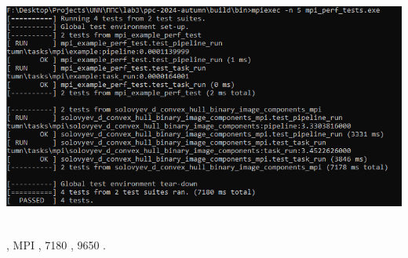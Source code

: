 \documentclass[a4paper]{article}
\begin{document}
\begin{center}
\includegraphics[width=439.14pt,height=222.69pt]{report-img002.png}
\end{center}
{
\foreignlanguage{russian}{{\CYRV} {\cyrr}{\cyre}{\cyrz}{\cyru}{\cyrl}{\cyrsftsn}{\cyrt}{\cyra}{\cyrt}{\cyre},
}\foreignlanguage{english}{MPI }\foreignlanguage{russian}{{\cyra}{\cyrl}{\cyrg}{\cyro}{\cyrr}{\cyri}{\cyrt}{\cyrm}
{\cyro}{\cyrk}{\cyra}{\cyrz}{\cyra}{\cyrl}{\cyrs}{\cyrya} {\cyrb}{\cyrery}{\cyrs}{\cyrt}{\cyrr}{\cyre}{\cyre}, {\cyrs}
{\cyro}{\cyrb}{\cyrshch}{\cyri}{\cyrm} {\cyrv}{\cyrr}{\cyre}{\cyrm}{\cyre}{\cyrn}{\cyre}{\cyrm}
{\cyrr}{\cyra}{\cyrb}{\cyro}{\cyrt}{\cyrery} {\cyrv} }\foreignlanguage{english}{7}\foreignlanguage{russian}{180
{\cyrm}{\cyrs}, {\cyrv} {\cyrt}{\cyro} {\cyrv}{\cyrr}{\cyre}{\cyrm}{\cyrya} {\cyrk}{\cyra}{\cyrk}
{\cyrp}{\cyro}{\cyrs}{\cyrl}{\cyre}{\cyrd}{\cyro}{\cyrv}{\cyra}{\cyrt}{\cyre}{\cyrl}{\cyrsftsn}{\cyrn}{\cyra}{\cyrya}
{\cyrv}{\cyre}{\cyrr}{\cyrs}{\cyri}{\cyrya} {\cyra}{\cyrl}{\cyrg}{\cyro}{\cyrr}{\cyri}{\cyrt}{\cyrm}{\cyra}
{\cyrp}{\cyro}{\cyrk}{\cyra}{\cyrz}{\cyra}{\cyrl}{\cyra}
{\cyrr}{\cyre}{\cyrz}{\cyru}{\cyrl}{\cyrsftsn}{\cyrt}{\cyra}{\cyrt} {\cyrv} }\foreignlanguage{english}{9650
}\foreignlanguage{russian}{{\cyrm}{\cyrs}.}}
\newpage
{}
\end{document}
